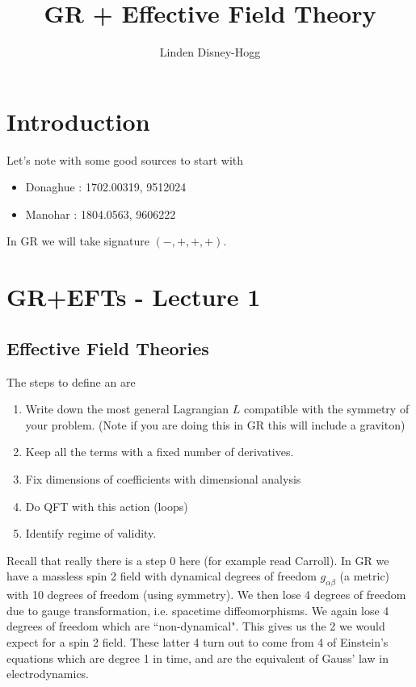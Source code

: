 \documentclass{article}
\title{GR + Effective Field Theory}
\author{Linden Disney-Hogg}
\date{}
\begin{document}
\maketitle
\tableofcontents

\section{Introduction}
Let's note with some good sources to start with 
\begin{itemize}
	\item Donaghue : 1702.00319, 9512024
	\item Manohar : 1804.0563, 9606222
\end{itemize}
In GR we will take signature $(-, +, +, +)$. 
\section{GR+EFTs - Lecture 1}
\subsection{Effective Field Theories}

\begin{definition}[EFT]
The steps to define an  are 
\begin{enumerate}
	\item Write down the most general Lagrangian $L$ compatible with the symmetry of your problem. (Note if you are doing this in GR this will include a graviton)
	\item Keep all the terms with a fixed number of derivatives. 
	\item Fix dimensions of coefficients with dimensional analysis
	\item Do QFT with this action (loops)
	\item Identify regime of validity. 
\end{enumerate}
\end{definition}
Recall that really there is a step 0 here (for example read Carroll). In GR we have a massless spin 2 field with dynamical degrees of freedom $g_{\alpha\beta}$ (a metric) with 10 degrees of freedom (using symmetry). We then lose 4 degrees of freedom due to gauge transformation, i.e. spacetime diffeomorphisms. We again lose 4 degrees of freedom which are ``non-dynamical". This gives us the 2 we would expect for a spin 2 field. These latter 4 turn out to come from 4 of Einstein's equations which are degree 1 in time, and are the equivalent of Gauss' law in electrodynamics. 
\end{document}

